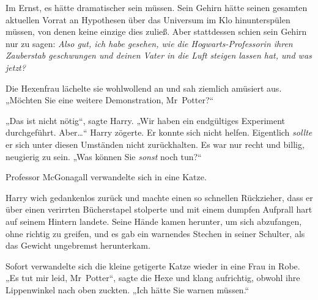 Im Ernst, es hätte dramatischer sein müssen. Sein Gehirn hätte seinen gesamten aktuellen Vorrat an Hypothesen über das Universum im Klo hinunterspülen müssen, von denen keine einzige dies zuließ. Aber stattdessen schien sein Gehirn nur zu sagen: \emph{Also gut, ich habe gesehen, wie die Hogwarts-Professorin ihren Zauberstab geschwungen und deinen Vater in die Luft steigen lassen hat, und was jetzt?}

Die Hexenfrau lächelte sie wohlwollend an und sah ziemlich amüsiert aus. „Möchten Sie eine weitere Demonstration, Mr~Potter?“

„Das ist nicht nötig“, sagte Harry. „Wir haben ein endgültiges Experiment durchgeführt. Aber…“ Harry zögerte. Er konnte sich nicht helfen. Eigentlich \emph{sollte} er sich unter diesen Umständen nicht zurückhalten. Es war nur recht und billig, neugierig zu sein. „Was können Sie \emph{sonst} noch tun?“

Professor McGonagall verwandelte sich in eine Katze.

Harry wich gedankenlos zurück und machte einen so schnellen Rückzieher, dass er über einen verirrten Bücherstapel stolperte und mit einem dumpfen Aufprall hart auf seinem Hintern landete. Seine Hände kamen herunter, um sich abzufangen, ohne richtig zu greifen, und es gab ein warnendes Stechen in seiner Schulter, als das Gewicht ungebremst herunterkam.

Sofort verwandelte sich die kleine getigerte Katze wieder in eine Frau in Robe. „Es tut mir leid, Mr~Potter“, sagte die Hexe und klang aufrichtig, obwohl ihre Lippenwinkel nach oben zuckten. „Ich hätte Sie warnen müssen.“

